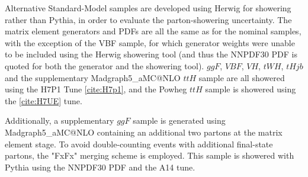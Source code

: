 Alternative Standard-Model samples are developed using Herwig for showering rather than Pythia, in order to evaluate the parton-showering uncertainty. The matrix element generators and PDFs are all the same as for the nominal samples, with the exception of the VBF sample, for which generator weights were unable to be included using the Herwig showering tool (and thus the NNPDF30 PDF is quoted for both the generator and the showering tool). $ggF$, $VBF$, $VH$, $tWH$, $tHjb$ and the supplementary Madgraph5\_aMC@NLO $ttH$ sample are all showered using the H7P1 Tune \ref{cite:H7p1}, and the Powheg $ttH$ sample is showered using the \ref{cite:H7UE} tune.

Additionally, a supplementary $ggF$ sample is generated using Madgraph5\_aMC@NLO containing an additional two partons at the matrix element stage. To avoid double-counting events with additional final-state partons, the "FxFx" merging scheme is employed. This sample is showered with Pythia using the NNPDF30 PDF and the A14 tune.
 
\begin{table}[h!]
  \centering
  \caption{Summary of alternative signal samples}
  \label{tab:signal_samples_herwig}
\end{table}  

